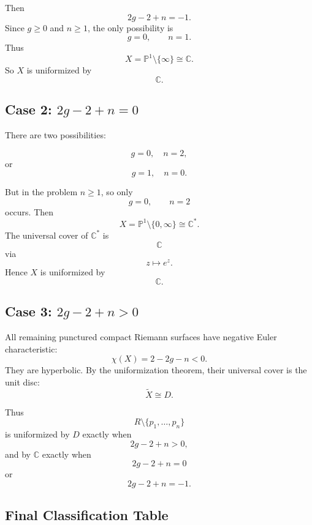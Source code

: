 \documentclass[12pt,a4paper]{article}
\theoremstyle{notespace}
\begin{document}
Then
\[
2g-2+n=-1.
\]
Since \(g\geq 0\) and \(n\geq 1\), the only possibility is
\[
g=0,\qquad n=1.
\]
Thus
\[
X=\mathbb P^1\setminus\{\infty\}\cong \mathbb C.
\]
So \(X\) is uniformized by
\[
\mathbb C.
\]

\subsection*{Case 2: \(2g-2+n=0\)}

There are two possibilities:

\[
g=0,\quad n=2,
\]
or
\[
g=1,\quad n=0.
\]

But in the problem \(n\geq 1\), so only
\[
g=0,\qquad n=2
\]
occurs. Then
\[
X=\mathbb P^1\setminus\{0,\infty\}\cong \mathbb C^*.
\]
The universal cover of \(\mathbb C^*\) is
\[
\mathbb C
\]
via
\[
z\mapsto e^z.
\]
Hence \(X\) is uniformized by
\[
\mathbb C.
\]

\subsection*{Case 3: \(2g-2+n>0\)}

All remaining punctured compact Riemann surfaces have negative Euler characteristic:
\[
\chi(X)=2-2g-n<0.
\]
They are hyperbolic. By the uniformization theorem, their universal cover is the unit disc:
\[
\widetilde X\cong D.
\]

Thus
\[
R\setminus\{p_1,\dots,p_n\}
\]
is uniformized by \(D\) exactly when
\[
2g-2+n>0,
\]
and by \(\mathbb C\) exactly when
\[
2g-2+n=0
\]
or
\[
2g-2+n=-1.
\]


\subsection{Final Classification Table}
\end{document}
